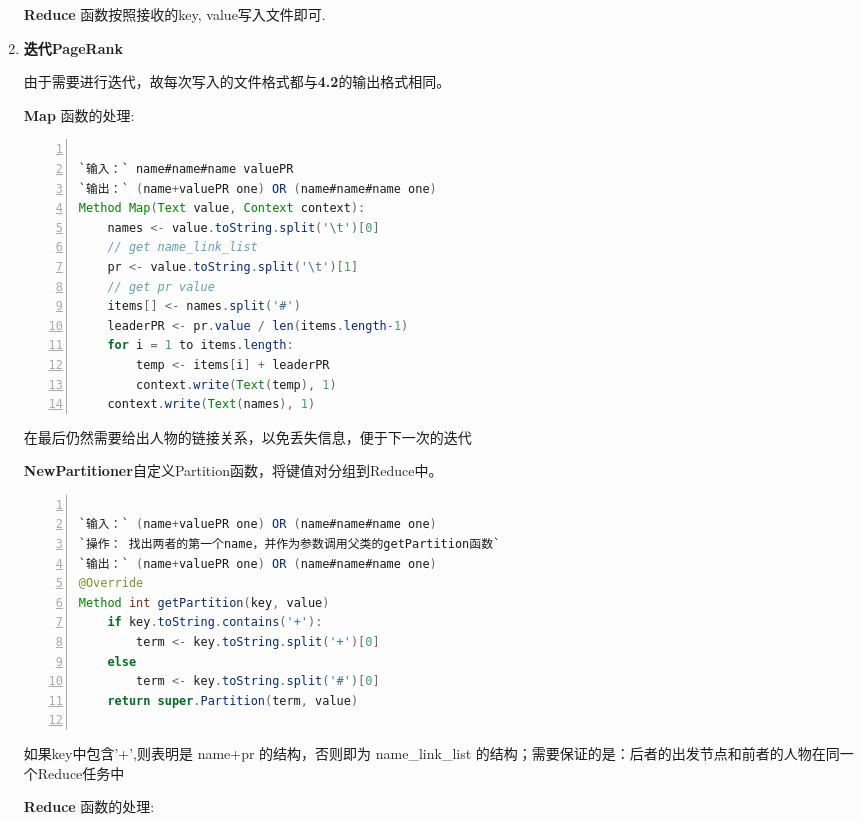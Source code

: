 \documentclass{ctexart}
\begin{document}
\begin{enumerate}[I]
\begin{lstlisting}[language=java, numbers=left, numberstyle=\tiny, frame=shadowbox, basicstyle=\ttfamily, escapeinside=``]
		\end{lstlisting}
		\par \textbf{Reduce} 函数按照接收的key, value写入文件即可.
		
		
		
		\item \textbf{迭代PageRank}
		\par 由于需要进行迭代，故每次写入的文件格式都与\textbf{4.2}的输出格式相同。
		\par \textbf{Map} 函数的处理: 
		\begin{lstlisting}[language=java, numbers=left, numberstyle=\tiny, frame=shadowbox, basicstyle=\ttfamily, escapeinside=``]

`输入：` name#name#name valuePR
`输出：` (name+valuePR one) OR	(name#name#name one)
Method Map(Text value, Context context):	
	names <- value.toString.split('\t')[0]
	// get name_link_list
	pr <- value.toString.split('\t')[1]
	// get pr value
	items[] <- names.split('#')
	leaderPR <- pr.value / len(items.length-1)
	for i = 1 to items.length:
		temp <- items[i] + leaderPR
		context.write(Text(temp), 1)
	context.write(Text(names), 1)
		\end{lstlisting}
	\par 在最后仍然需要给出人物的链接关系，以免丢失信息，便于下一次的迭代 
	
	\par \textbf{NewPartitioner}自定义Partition函数，将键值对分组到Reduce中。
		\begin{lstlisting}[language=java, numbers=left, numberstyle=\tiny, frame=shadowbox, basicstyle=\ttfamily, escapeinside=``]
		
`输入：` (name+valuePR one) OR	(name#name#name one)
`操作： 找出两者的第一个name，并作为参数调用父类的getPartition函数` 
`输出：` (name+valuePR one) OR	(name#name#name one)
@Override
Method int getPartition(key, value)
	if key.toString.contains('+'):
		term <- key.toString.split('+')[0]
	else
		term <- key.toString.split('#')[0]
	return super.Partition(term, value)	
			
		\end{lstlisting}
	\par 如果key中包含'+',则表明是 name+pr 的结构，否则即为 name\_link\_list 的结构；需要保证的是：后者的出发节点和前者的人物在同一个Reduce任务中 
		
		\par \textbf{Reduce} 函数的处理:	
		

\end{enumerate}
\end{document}

